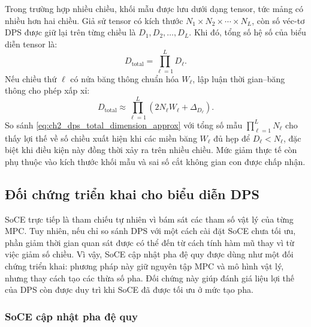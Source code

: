 Trong trường hợp nhiều chiều, khối mẫu được lưu dưới dạng tensor, tức mảng có nhiều hơn hai chiều. Giả sử tensor có kích thước \(N_1\times N_2\times\cdots\times N_L\), còn số véc-tơ DPS được giữ lại trên từng chiều là \(D_1,D_2,\ldots,D_L\). Khi đó, tổng số hệ số của biểu diễn tensor là:
\begin{equation}
D_{\mathrm{total}}=\prod_{\ell=1}^{L}D_\ell.
\label{eq:ch2_dps_total_dimension}
\end{equation}
Nếu chiều thứ \(\ell\) có nửa băng thông chuẩn hóa \(W_\ell\), lập luận thời gian--băng thông cho phép xấp xỉ:
\begin{equation}
D_{\mathrm{total}}
\approx
\prod_{\ell=1}^{L}\left(2N_\ell W_\ell+\Delta_{D_\ell}\right).
\label{eq:ch2_dps_total_dimension_approx}
\end{equation}
So sánh \eqref{eq:ch2_dps_total_dimension_approx} với tổng số mẫu \(\prod_{\ell=1}^{L}N_\ell\) cho thấy lợi thế về số chiều xuất hiện khi các miền băng \(W_\ell\) đủ hẹp để \(D_\ell<N_\ell\), đặc biệt khi điều kiện này đồng thời xảy ra trên nhiều chiều. Mức giảm thực tế còn phụ thuộc vào kích thước khối mẫu và sai số cắt không gian con được chấp nhận.

\subsection{Đối chứng triển khai cho biểu diễn DPS}
\label{subsec:ch2_alternative_baselines}

SoCE trực tiếp là tham chiếu tự nhiên vì bám sát các tham số vật lý của từng MPC. Tuy nhiên, nếu chỉ so sánh DPS với một cách cài đặt SoCE chưa tối ưu, phần giảm thời gian quan sát được có thể đến từ cách tính hàm mũ thay vì từ việc giảm số chiều. Vì vậy, SoCE cập nhật pha đệ quy được dùng như một đối chứng triển khai: phương pháp này giữ nguyên tập MPC và mô hình vật lý, nhưng thay cách tạo các thừa số pha. Đối chứng này giúp đánh giá liệu lợi thế của DPS còn được duy trì khi SoCE đã được tối ưu ở mức tạo pha.

\subsubsection{SoCE cập nhật pha đệ quy}
\label{subsubsec:ch2_recursive_soce}

